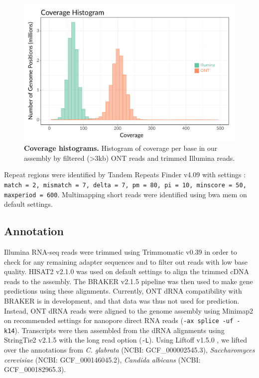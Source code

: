 \begin{figure}[!ht]
\centering
\includegraphics[width = 1\linewidth,keepaspectratio]{figure/covhist.pdf}
\caption[Coverage histograms]{{\bf Coverage histograms.} Histogram of coverage per base in our assembly by filtered (>3kb) ONT reads and trimmed Illumina reads. }
\label{fig:covhist}
\end{figure}


Repeat regions were identified by Tandem Repeats Finder v4.09 \citep{Benson1999-lr} with settings \citep{Xu2020-ta}: \texttt{match = 2, mismatch = 7, delta = 7, pm = 80, pi = 10, minscore = 50, maxperiod = 600}. Multimapping short reads were identified using bwa mem \citep{Li2013-ec} on default settings.

\subsection{Annotation}
\label{sec:methods}

Illumina RNA-seq reads were trimmed using Trimmomatic v0.39 \citep{Bolger2014-ax} in order to check for any remaining adapter sequences and to filter out reads with low base quality. HISAT2 v2.1.0 was used on default settings to align the trimmed cDNA reads to the assembly. The BRAKER v2.1.5 pipeline \citep{Hoff2019-rd} was then used to make gene predictions using these alignments. Currently, ONT dRNA compatibility with BRAKER is in development, and that data was thus not used for prediction. Instead, ONT dRNA reads were aligned to the genome assembly using Minimap2 on recommended settings for nanopore direct RNA reads (\texttt{-ax splice -uf -k14}). Transcripts were then assembled from the dRNA alignments using StringTie2 v2.1.5 \citep{Kovaka2019-lg} with the long read option (\texttt{-L}). Using Liftoff v1.5.0 \citep{Shumate2020-fo}, we lifted over the annotations from \textit{C. glabrata} (NCBI: GCF\_000002545.3), \textit{Saccharomyces cerevisiae} (NCBI: GCF\_000146045.2), \textit{Candida albicans} (NCBI: GCF\_000182965.3).

